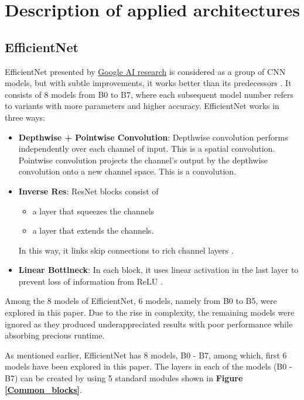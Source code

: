 \documentclass[conference]{IEEEtran}
\begin{document}
\section{Description of applied architectures}
\subsection{EfficientNet}

EfficientNet presented by \href{https://ai.google/research/}{Google AI research} is considered as a group of CNN models, but with subtle improvements, it works better than its predecessors \cite{tan2019efficientnet}. It consists of 8 models from B0 to B7, where each subsequent model number refers to variants with more parameters and higher accuracy. EfficientNet works in three ways:
\begin{itemize}
    \item \textbf{Depthwise + Pointwise Convolution}: Depthwise convolution performs independently over each channel of input. This is a spatial convolution. Pointwise convolution projects the channel's output by the depthwise convolution onto a new channel space. This is a  convolution.
    \item \textbf{Inverse Res}: ResNet blocks consist of 
    \begin{itemize} 
        \item a layer that squeezes the channels
        \item a layer that extends the channels. 
    \end{itemize}
    In this way, it links skip connections to rich channel layers \cite{he2016deep}.
    \item \textbf{Linear Bottlneck}: In each block, it uses linear activation in the last layer to prevent loss of information from ReLU \cite{agarap2018deep}. 
\end{itemize}

Among the 8 models of EfficientNet, 6 models, namely from B0 to B5, were explored in this paper. Due to the rise in complexity, the remaining models were ignored as they produced underappreciated results with poor performance while absorbing precious runtime.

As mentioned earlier, EfficientNet has 8 models, B0 - B7, among which, first 6 models have been explored in this paper. The layers in each of the models (B0 - B7) can be created by using 5 standard modules shown in \textbf{Figure \ref{Common_blocks}}. 
\end{document}
